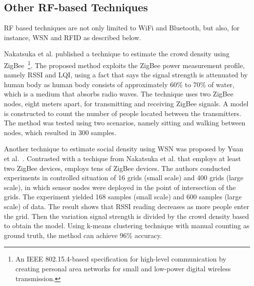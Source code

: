 	









	\subsection{Other RF-based Techniques} %
	\label{sub:other_rf_techniques}
	\ac{RF} based techniques are not only limited to WiFi and Bluetooth, but also, for instance, \ac{WSN} and \ac{RFID} as described below.

	Nakatsuka et al. published a technique to estimate the crowd density using ZigBee~\cite{thesis042}\footnote{An IEEE 802.15.4-based specification for high-level communication by creating personal area networks for small and low-power digital wireless transmission.}. The proposed method exploits the ZigBee power measurement profile, namely \ac{RSSI} and \ac{LQI}, using a fact that says the signal strength is attenuated by human body as human body consists of approximately 60\% to 70\% of water, which is a medium that absorbs radio waves. The technique uses two ZigBee nodes, eight meters apart, for transmitting and receiving ZigBee signals. A model is constructed to count the number of people located between the transmitters. The method was tested using two scenarios, namely sitting and walking between nodes, which resulted in 300 samples.
	
	Another technique to estimate social density using \ac{WSN} was proposed by Yuan et al.~\cite{thesis043}. Contrasted with a techique from Nakatsuka et al. that employs at least two ZigBee devices, \cite{thesis043} employs tens of ZigBee devices.
	The authors conducted experiments in controlled situation of 16 grids (small scale) and 400 grids (large scale), in which sensor nodes were deployed in the point of intersection of the grids. The experiment yielded 168 samples (small scale) and 600 samples (large scale) of data. The result shows that \ac{RSSI} reading decreases as more people enter the grid. Then the variation signal strength is divided by the crowd density based to obtain the model. Using k-means clustering technique with manual counting as ground truth, the method can achieve 96\% accuracy.


